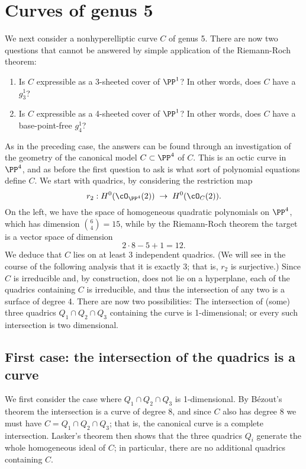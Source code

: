 

\section{Curves of genus 5}

We next consider a nonhyperelliptic curve $C$ of genus 5. There are now two questions that cannot be answered by simple application of the Riemann-Roch theorem:

\begin{enumerate}
\item Is $C$ expressible as a 3-sheeted cover of $\PP^1$? In other words, does $C$ have a $g^1_3$?
\item Is $C$ expressible as a 4-sheeted cover of $\PP^1$? In other words, does $C$ have a base-point-free $g^1_4$?
\end{enumerate}

As in the preceding case, the answers can be found through an investigation of the geometry of the canonical model $C \subset \PP^4$ of $C$. This is an octic curve in $\PP^4$, and as before the first question to ask is what sort of polynomial equations define $C$. We start with quadrics, by considering the restriction map
$$
r_2 : H^0(\cO_{\PP^4}(2)) \; \to \; H^0(\cO_{C}(2)).
$$
On the left, we have the space of homogeneous quadratic polynomials on $\PP^4$, which has dimension $\binom{6}{4} = 15$, while by the Riemann-Roch theorem the target is a vector space of dimension
$$
2\cdot8 - 5 + 1 = 12.
$$
We deduce that $C$ lies on at least 3 independent quadrics. (We will see in the course of the following analysis that it is exactly 3; that is, $r_2$ is surjective.) Since $C$ is irreducible and, by construction, does not lie on a hyperplane, each of the quadrics containing $C$ is irreducible, and thus the intersection of any two is a surface of degree 4. There are now two possibilities:  The intersection of (some) three quadrics $Q_1 \cap Q_2 \cap Q_3$ containing the curve is 1-dimensional; or every such intersection is two dimensional. 

\subsection{First case: the intersection of the quadrics is a curve}\label{non-trigonal genus 5}

We first consider the case where $Q_1 \cap Q_2 \cap Q_3$ is 1-dimensional.  By B\'ezout's theorem the intersection is a curve of degree 8, and since $C$ also has degree 8 we must have $C=Q_1 \cap Q_2 \cap Q_3$; that is, the canonical curve is a complete intersection. Lasker's theorem then shows that the three quadrics $Q_i$ generate the whole homogeneous ideal of $C$; in particular, there are no additional quadrics containing $C$.

